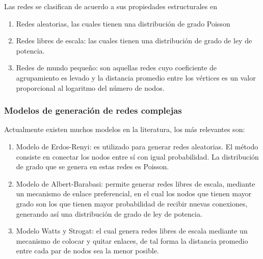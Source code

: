 Las redes se clasifican de acuerdo a sus propiedades estructurales en

\begin{enumerate}
    \item Redes aleatorias, las cuales tienen una distribución de grado Poisson
    \item Redes libres de escala: las cuales tienen una distribución de grado de ley de potencia.
    \item Redes de mundo pequeño: son aquellas redes cuyo coeficiente de agrupamiento es levado y la distancia promedio entre los vértices es un valor proporcional al logaritmo del número de nodos.
\end{enumerate}

\subsubsection{Modelos de generación de redes complejas}

Actualmente existen muchos modelos en la literatura, los más relevantes son:

\begin{enumerate}
    \item Modelo de Erdos-Renyi\cite{Erdos1959}: es utilizado para generar redes aleatorias. El método consiste en conectar los nodos entre sí con igual probabilidad. La distribución de grado que se genera en estas redes es Poisson.
    \item Modelo de Albert-Barabasi\cite{Barabaacutesi1999}: permite generar redes libres de escala, mediante un mecanismo de enlace preferencial, en el cual los nodos que tienen mayor grado son los que tienen mayor probabilidad de recibir nuevas conexiones, generando así una distribución de grado de ley de potencia.
    \item Modelo Watts y Strogat\cite{Watts1998}: el cual genera redes libres de escala mediante un mecanismo de colocar y quitar enlaces, de tal forma la distancia promedio entre cada par de nodos sea la menor posible.
\end{enumerate}


